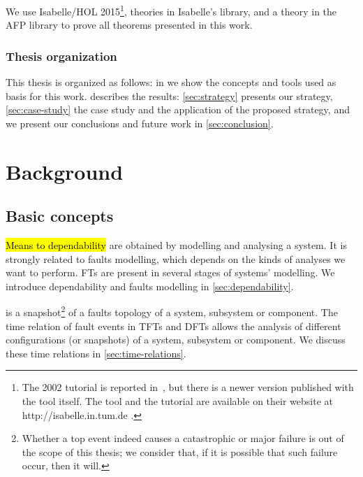 \documentclass[12pt,openright,twoside,a4paper,oldfontcommands,english,brazil,draft]{abntex2}
\newcommand{\todo}[1]{\adnote{#1}}
\theoremstyle{theo}
\begin{document}
We use Isabelle/HOL 2015\footnote{The 2002 tutorial is reported in~\cite{NPW2002}, but there is a newer version published with the tool itself.
The tool and the tutorial are available on their website at http://isabelle.in.tum.de .}, theories in Isabelle's library, and a theory in the AFP library \cite{JM2005} to prove all theorems presented in this work.

\section{Thesis organization}

This thesis is organized as follows: in \cref{part:background} we show the concepts and tools used as basis for this work.
 describes the results: \cref{sec:strategy} presents our strategy, \cref{sec:case-study} the case study and the application of the proposed strategy, and we present our conclusions and future work in \cref{sec:conclusion}.

\part{Background}
\label{part:background}

\chapter{Basic concepts}
\label{chap:basic-concepts}

\hl{Means to dependability}  are obtained by modelling and analysing a system.
It is strongly related to faults modelling, which depends on the kinds of analyses we want to perform.
\Acp{FT} are present in several stages of systems' modelling.
We introduce dependability and faults modelling in \cref{sec:dependability}.

 is a snapshot\footnote{Whether a top event indeed causes a catastrophic or major failure is out of the scope of this thesis; we consider that, if it is possible that such failure occur, then it will.} of a faults topology of a system, subsystem or component.
The time relation of fault events in \acp{TFT} and \acp{DFT} allows the analysis of different configurations (or snapshots) of a system, subsystem or component.
We discuss these time relations in \cref{sec:time-relations}.
\end{document}

